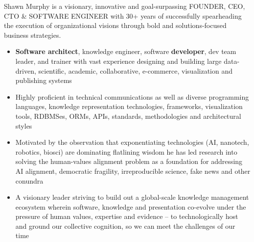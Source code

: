 \begin{par}
  Shawn Murphy is a visionary, innovative and goal-surpassing
  FOUNDER, CEO, CTO \& SOFTWARE ENGINEER with 30+ years of successfully spearheading
  the execution of organizational visions through bold and solutions-focused
  business strategies.
  \begin{itemize}
  \item \textbf{Software architect}, knowledge engineer,
    software \textbf{developer}, dev team leader,
    and trainer with vast experience designing and building large
    data-driven, scientific, academic, collaborative, e-commerce,
    visualization and publishing systems
  \item Highly proficient in technical communications as well as diverse
    programming languages, knowledge
    representation technologies, frameworks, visualization tools, RDBMSes,
    ORMs, APIs, standards, methodologies and architectural styles
  \item Motivated by the observation that exponentiating technologies
    (AI, nanotech, robotics, biosci) are dominating flatlining
    wisdom he has led research into solving the human-values
    alignment problem as a foundation for addressing AI alignment,
    democratic fragility, irreproducible science, fake news and other conundra
  \item A visionary leader striving to build out a global-scale
    knowledge management ecosystem wherein software, knowledge and
    presentation co-evolve under the pressure of human values, expertise
    and evidence -- to technologically host and ground our collective
    cognition, so we can meet the challenges of our time
  \end{itemize}

\begin{comment}
Examples of his work include:
  a vehicle fleet tracking system with RESTful API;
  multiple dynamic knowledge visualization systems;
  a custom database publishing system used by the largest real estate
    markets in Western Canada;
  real-estate systems powered by his own RETS implementation;
  a large bibliographic collaboration system seeded with Library of Congress data;
  a Laboratory Information Management System for disease diagnosis which
    captured, processed and reported on disparate scientific data streams;
  recruiting management systems;
  numerous B2B and B2C e-commerce technologies and systems
    (handling both digital and tangible goods);
  and many other projects involving sophisticated data-sets and processing.
\end{comment}

\end{par}
